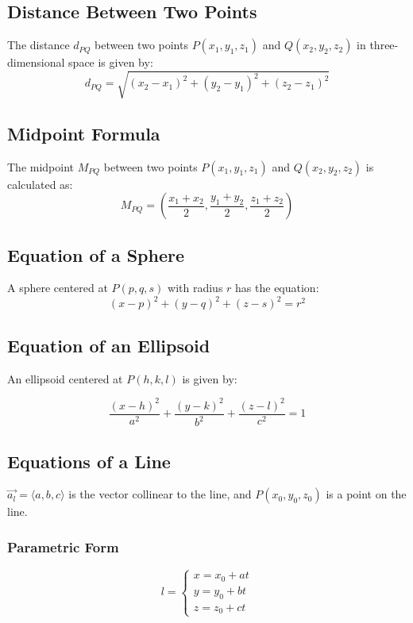 \documentclass[a4paper,12pt,openany]{book}
\begin{document}
\subsection{Distance Between Two Points}

The distance \(d_{PQ}\) between two points \( P(x_1, y_1, z_1) \) and \( Q(x_2, y_2, z_2) \) in three-dimensional space is given by:
\begin{equation}
    d_{PQ} = \sqrt{(x_2 - x_1)^2 + (y_2 - y_1)^2 + (z_2 - z_1)^2}
\end{equation}

\subsection{Midpoint Formula}

The midpoint \(M_{PQ}\) between two points \( P(x_1, y_1, z_1) \) and \( Q(x_2, y_2, z_2) \) is calculated as:
\begin{equation}
    M_{PQ} = \left(\frac{x_1 + x_2}{2}, \frac{y_1 + y_2}{2}, \frac{z_1 + z_2}{2}\right)
\end{equation}

\subsection{Equation of a Sphere}

A sphere centered at \(P(p, q, s)\) with radius \( r \) has the equation:
\begin{equation}
    (x - p)^2 + (y - q)^2 + (z - s)^2 = r^2
\end{equation}

\subsection{Equation of an Ellipsoid}

An ellipsoid centered at \(P(h, k, l)\) is given by:

\begin{equation}
    \frac{(x-h)^2}{a^2} +  
    \frac{(y-k)^2}{b^2} + 
    \frac{(z-l)^2}{c^2} = 1
\end{equation}

\subsection{Equations of a Line}
\(\vec{a_l} = \langle a, b, c \rangle\) is the vector collinear to the line, and \(P(x_0, y_0, z_0)\) is a point on the line.
\subsubsection{Parametric Form}
\begin{equation}
    l = 
    \begin{cases}
        x = x_0 + at\\
        y = y_0 + bt\\
        z = z_0 + ct
    \end{cases}
\end{equation}
\end{document}

